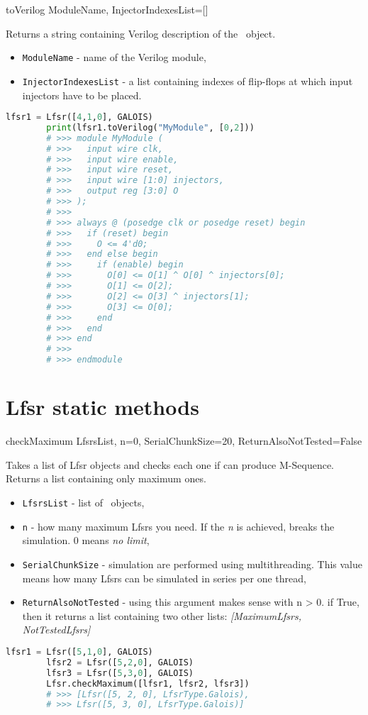  {toVerilog} {ModuleName, InjectorIndexesList=[]} {
	Returns a string containing Verilog description of the \Lfsr\ object.
	\begin{itemize}
		\item \texttt{ModuleName} - name of the Verilog module,
		\item \texttt{InjectorIndexesList} - a list containing indexes of flip-flops at which input injectors have to be placed.
	\end{itemize}
}
\begin{lstlisting}[language=Python]
		lfsr1 = Lfsr([4,1,0], GALOIS)
		print(lfsr1.toVerilog("MyModule", [0,2]))
		# >>> module MyModule (
		# >>>   input wire clk,
		# >>>   input wire enable,
		# >>>   input wire reset,
		# >>>   input wire [1:0] injectors,
		# >>>   output reg [3:0] O
		# >>> );
		# >>> 
		# >>> always @ (posedge clk or posedge reset) begin
		# >>>   if (reset) begin
		# >>>     O <= 4'd0;
		# >>>   end else begin
		# >>>     if (enable) begin
		# >>>       O[0] <= O[1] ^ O[0] ^ injectors[0];
		# >>>       O[1] <= O[2];
		# >>>       O[2] <= O[3] ^ injectors[1];
		# >>>       O[3] <= O[0];
		# >>>     end
		# >>>   end
		# >>> end
		# >>> 
		# >>> endmodule
\end{lstlisting}

\section{Lfsr static methods}

 {checkMaximum} {LfsrsList, n=0, SerialChunkSize=20, ReturnAlsoNotTested=False} {
	Takes a list of Lfsr objects and checks each one if can produce M-Sequence. Returns a list containing only maximum ones.
	\begin{itemize}
		\item \texttt{LfsrsList} - list of \Lfsr\ objects,
		\item \texttt{n} - how many maximum Lfsrs you need. If the \textit{n} is achieved, breaks the simulation. 0 means \textit{no limit},
		\item \texttt{SerialChunkSize} - simulation are performed using multithreading. This value means how many Lfsrs can be simulated in series per one thread,
		\item \texttt{ReturnAlsoNotTested} - using this argument makes sense with n > 0. if True, then it returns a list containing two other lists: \textit{[MaximumLfsrs, NotTestedLfsrs]}
	\end{itemize}
}
\begin{lstlisting}[language=Python]
		lfsr1 = Lfsr([5,1,0], GALOIS)
		lfsr2 = Lfsr([5,2,0], GALOIS)
		lfsr3 = Lfsr([5,3,0], GALOIS)
		Lfsr.checkMaximum([lfsr1, lfsr2, lfsr3])
		# >>> [Lfsr([5, 2, 0], LfsrType.Galois), 
		# >>> Lfsr([5, 3, 0], LfsrType.Galois)]
\end{lstlisting}

